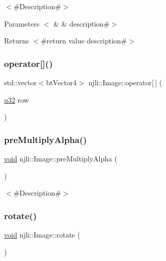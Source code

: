 $<$\#\+Description\#$>$


\begin{DoxyParams}[1]{Parameters}
$<$ & {\em } & description\#$>$\\
\hline
\end{DoxyParams}
\begin{DoxyReturn}{Returns}
$<$\#return value description\#$>$ 
\end{DoxyReturn}
\mbox{\label{classnjli_1_1_image_aa3d366f9d5c3535ed96dd47b19f279ef}} 
\subsubsection{\texorpdfstring{operator[]()}{operator[]()}}
{\footnotesize\ttfamily std\+::vector$<$bt\+Vector4$>$ njli\+::\+Image\+::operator\mbox{[}$\,$\mbox{]} (\begin{DoxyParamCaption}\item[{\mbox{\hyperlink{_util_8h_a10e94b422ef0c20dcdec20d31a1f5049}{u32}}}]{row }\end{DoxyParamCaption})}

\mbox{\label{classnjli_1_1_image_a5d36dc67447d4f30561baa36357ec223}} 
\subsubsection{\texorpdfstring{pre\+Multiply\+Alpha()}{preMultiplyAlpha()}}
{\footnotesize\ttfamily \mbox{\hyperlink{_thread_8h_af1e856da2e658414cb2456cb6f7ebc66}{void}} njli\+::\+Image\+::pre\+Multiply\+Alpha (\begin{DoxyParamCaption}{ }\end{DoxyParamCaption})}

$<$\#\+Description\#$>$ \mbox{\label{classnjli_1_1_image_ab7123ed8ee5c43dbd9778cdac8323a86}} 
\subsubsection{\texorpdfstring{rotate()}{rotate()}}
{\footnotesize\ttfamily \mbox{\hyperlink{_thread_8h_af1e856da2e658414cb2456cb6f7ebc66}{void}} njli\+::\+Image\+::rotate (\begin{DoxyParamCaption}{ }\end{DoxyParamCaption})}

